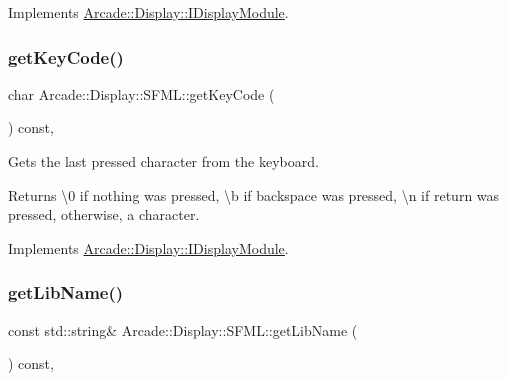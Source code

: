 Implements \mbox{\hyperlink{classArcade_1_1Display_1_1IDisplayModule_aab078d82e6fdd32682553947c20226ac}{Arcade\+::\+Display\+::\+I\+Display\+Module}}.

\mbox{\label{classArcade_1_1Display_1_1SFML_ae2bf9e9c157a9f0ae8d1b60bd072e881}} 
\subsubsection{\texorpdfstring{getKeyCode()}{getKeyCode()}}
{\footnotesize\ttfamily char Arcade\+::\+Display\+::\+S\+F\+M\+L\+::get\+Key\+Code (\begin{DoxyParamCaption}{ }\end{DoxyParamCaption}) const\hspace{0.3cm}{\ttfamily [final]}, {\ttfamily [virtual]}}



Gets the last pressed character from the keyboard. 

\begin{DoxyReturn}{Returns}
\textbackslash{}0 if nothing was pressed, \textbackslash{}b if backspace was pressed, \textbackslash{}n if return was pressed, otherwise, a character. 
\end{DoxyReturn}


Implements \mbox{\hyperlink{classArcade_1_1Display_1_1IDisplayModule_a403f8a0f065dad707a881ef3cee79805}{Arcade\+::\+Display\+::\+I\+Display\+Module}}.

\mbox{\label{classArcade_1_1Display_1_1SFML_a8c323cea968403cb2edf791d37dc7887}} 
\subsubsection{\texorpdfstring{getLibName()}{getLibName()}}
{\footnotesize\ttfamily const std\+::string\& Arcade\+::\+Display\+::\+S\+F\+M\+L\+::get\+Lib\+Name (\begin{DoxyParamCaption}{ }\end{DoxyParamCaption}) const\hspace{0.3cm}{\ttfamily [final]}, {\ttfamily [virtual]}}



